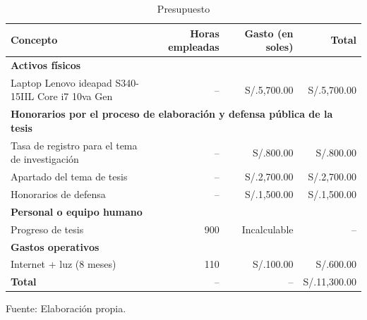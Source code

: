 \begin{table}[h!]
	\caption{Presupuesto}
	\label{tab:presupuesto}
	\centering
	\small
	\begin{tabular}{lrrr}
		\toprule
		\textbf{Concepto} & \textbf{Horas empleadas} & \textbf{Gasto (en soles)} & \textbf{Total} \\
		\midrule
		\multicolumn{4}{l}{\textbf{Activos físicos}} \\
		Laptop Lenovo ideapad S340-15IIL Core i7 10va Gen & -- & S/.5,700.00 & S/.5,700.00 \\
		\midrule
		\multicolumn{4}{l}{\textbf{Honorarios por el proceso de elaboración y defensa pública de la tesis}} \\
		Tasa de registro para el tema de investigación & -- & S/.800.00 & S/.800.00 \\
		Apartado del tema de tesis & -- & S/.2,700.00 & S/.2,700.00 \\
		Honorarios de defensa & -- & S/.1,500.00 & S/.1,500.00 \\
		\midrule
		\multicolumn{4}{l}{\textbf{Personal o equipo humano}} \\
		Progreso de tesis & 900 & Incalculable & -- \\
		\midrule
		\multicolumn{4}{l}{\textbf{Gastos operativos}} \\
		Internet + luz (8 meses) & 110 & S/.100.00 & S/.600.00 \\
		\midrule
		\textbf{Total} & -- & -- & S/.11,300.00 \\
		\bottomrule
	\end{tabular}
	\begin{flushleft}	%
		\small Fuente: Elaboración propia.
	\end{flushleft}
\end{table}
